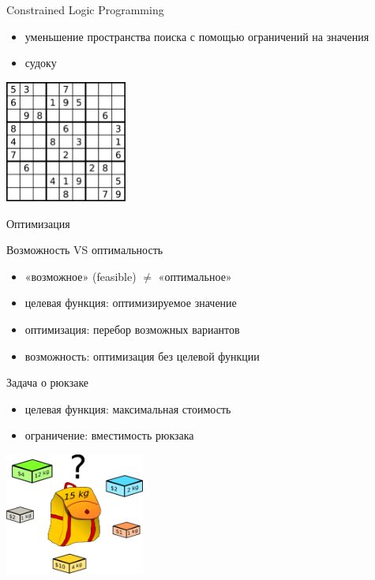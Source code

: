 \documentclass[10pt]{beamer}
\begin{document}
\begin{frame}{Constrained Logic Programming}
  \begin{itemize}
  \item уменьшение пространства поиска с помощью ограничений на значения
  \item судоку
  \end{itemize}
  \begin{center}
    \includegraphics[height=4cm]{sudoku.pdf}
  \end{center}
\end{frame}

\begin{frame}
  \Large
  Оптимизация
\end{frame}

\begin{frame}{Возможность VS оптимальность}
  \begin{itemize}
  \item «возможное» (feasible) $\neq$ «оптимальное»
  \item целевая функция: оптимизируемое значение
  \item оптимизация: перебор возможных вариантов
  \item возможность: оптимизация без целевой функции
  \end{itemize}
\end{frame}

\begin{frame}{Задача о рюкзаке}
  \begin{itemize}
  \item целевая функция: максимальная стоимость
  \item ограничение: вместимость рюкзака
  \end{itemize}
  \begin{center}
    \includegraphics[height=4cm]{knapsack.pdf}
  \end{center}
\end{frame}
\end{document}
